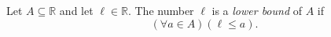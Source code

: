 \begin{definition}
\label{def:real-lower-bound}
Let $A\subseteq\mathbb{R}$ and let $\ell\in\mathbb{R}$. The number $\ell$
is a \emph{lower bound} of $A$ if
\[
  (\forall a\in A)(\ell\leq a).
\]
\end{definition}
